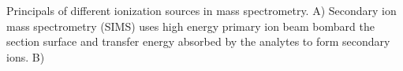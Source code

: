 \label{fig:ionisation}
Principals of different ionization sources in mass spectrometry. A) Secondary ion mass spectrometry (SIMS) uses high energy primary ion beam bombard the section surface and transfer energy absorbed by the analytes to form secondary ions. B) 